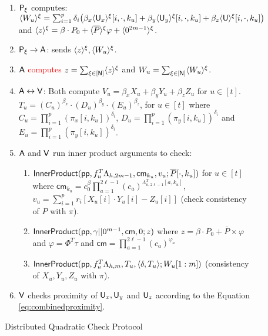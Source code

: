 \begin{figure}[t!]
{\begin{framed}
\begin{enumerate}[{\rm 1.}]
				\item $\mathsf{P}_\xi$ computes:
				$\langle{W_u}\rangle^\xi=\sum_{i=1}^p\delta_i\big(\beta_x\langle{\mathsf{U}_x}\rangle^\xi[i,\cdot,k_u]+\beta_y\langle{\mathsf{U}_y}\rangle^\xi[i,\cdot,k_u]+\beta_z\langle{\mathsf{U}}\rangle^\xi[i,\cdot,k_u]\big)$ and $\langle{z}\rangle^\xi =  \beta\cdot P_0 + \langle{\overline{P}}\rangle^\xi\varphi + \langle{0^{2m-1}}\rangle^\xi$.
				\item $\mathsf{P}_\xi\rightarrow\mathsf{A}$:  sends $\langle{z}\rangle^\xi, \langle{W_u}\rangle^\xi$.
				\item \textcolor{red}{$\mathsf{A}$ computes $z=\sum_{\xi\in[\mathsf{N}]} \langle{z}\rangle^\xi$} and $W_u = \sum_{\xi\in[\mathsf{N}]} \langle{W_u}\rangle^\xi$.
				\item $\mathsf{A} \leftrightarrow \mathsf{V}$: Both compute $V_u = \beta_x X_u + \beta_y Y_u + \beta_z Z_u$ for $u\in[t]$. $T_u = (C_u)^{\beta_x}\cdot(D_u)^{\beta_y}\cdot(E_u)^{\beta_z}$, for $u\in [t]$ where
				$C_u=\prod_{i=1}^{p}(\pi_x[i,k_u])^{\delta_i}$, $D_u=\prod_{i=1}^{p}(\pi_y[i,k_u])^{\delta_i}$
				and $E_u=\prod_{i=1}^{p}(\pi_y[i,k_u])^{\delta_i}$.
				\item $\mathsf{A}$ and $\mathsf{V}$ run inner product arguments to check:
				\begin{enumerate}
					\item $\mathsf{InnerProduct}(\mathsf{pp},f_u^T\Lambda_{h,2m-1},\mathsf{cm}_{k_u},v_u;\overline{P}[\cdot,k_u])$ for $u\in [t]$ where $\mathsf{cm}_{k_u}=c_0^{\beta}\prod_{a=1}^{2\ell-1}(c_a)^{\Lambda_{n,2\ell-1}^T[a,k_u]}$, 
					$v_u=\sum_{i=1}^p r_i[X_u[i]\cdot Y_u[i] - Z_u[i]]$ (check consistency of $P$ with $\pi$).
					\item $\mathsf{InnerProduct}(\mathsf{pp},\gamma||0^{m-1},\mathsf{cm},0;z)$ where $z=\beta\cdot P_0 + \overline{P}\times \varphi$ and $\varphi = \Phi^T\tau$ and $\mathsf{cm} = \prod_{a=1}^{2\ell-1} (c_a)^{\varphi_a}$ %
					\item
					$\mathsf{InnerProduct}(\mathsf{pp},f_u^T\Lambda_{h,m},T_u,\langle \delta,T_u\rangle;W_u[1:m])$ (consistency of $X_u, Y_u, Z_u$ with $\pi$).
				\end{enumerate}
				\item $\mathsf{V}$ checks proximity of $\mathsf{U}_x,\mathsf{U}_y$ and $\mathsf{U}_z$ according to the Equation \eqref{eq:combinedproximity}.
			\end{enumerate}
		\end{framed}
		\caption{Distributed Quadratic Check Protocol}
		\label{fig:distquadcheck}
	}
\end{figure}
